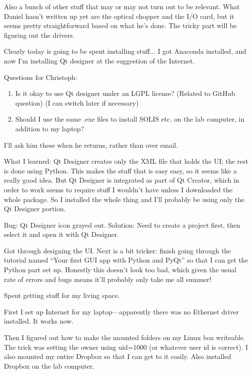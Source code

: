 \documentclass[11pt]{labbook}
\begin{document}
Also a bunch of other stuff that may or may not turn out to be relevant. What Daniel hasn't written up yet are the optical chopper and the I/O card, but it seems pretty straightforward based on what he's done. The tricky part will be figuring out the drivers.


Clearly today is going to be spent installing stuff... I got Anaconda installed, and now I'm installing Qt designer at the suggestion of the Internet.

Questions for Christoph:
\begin{enumerate}
\item Is it okay to use Qt designer under an LGPL license? (Related to GitHub question) (I can switch later if necessary)
\item Should I use the same .exe files to install SOLIS etc. on the lab computer, in addition to my laptop?
\end{enumerate}
I'll ask him these when he returns, rather than over email.

What I learned: Qt Designer creates only the XML file that holds the UI; the rest is done using Python. This makes the stuff that is easy easy, so it seems like a really good idea. But Qt Designer is integrated as part of Qt Creator, which in order to work seems to require stuff I wouldn't have unless I downloaded the whole package. So I installed the whole thing and I'll probably be using only the Qt Designer portion.

Bug: Qt Designer icon grayed out. Solution: Need to create a project first, then select it and open it with Qt Designer.

Got through designing the UI. Next is a bit tricker: finish going through the tutorial named ``Your first GUI app with Python and PyQt'' so that I can get the Python part set up. Honestly this doesn't look too bad, which given the usual rate of errors and bugs means it'll probably only take me all summer!


Spent getting stuff for my living space.


First I set up Internet for my laptop---apparently there was no Ethernet driver installed. It works now.

Then I figured out how to make the mounted folders on my Linux box writeable. The trick was setting the owner using uid=1000 (or whatever user id is correct). I also mounted my entire Dropbox so that I can get to it easily. Also installed Dropbox on the lab computer.
\end{document}
